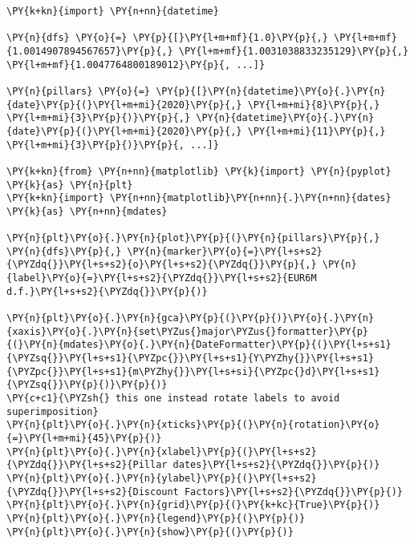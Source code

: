 \begin{Answer}
\begin{tcolorbox}[size=fbox, boxrule=1pt, colback=cellbackground, colframe=cellborder]
\begin{Verbatim}[commandchars=\\\{\}]
\PY{k+kn}{import} \PY{n+nn}{datetime}

\PY{n}{dfs} \PY{o}{=} \PY{p}{[}\PY{l+m+mf}{1.0}\PY{p}{,} \PY{l+m+mf}{1.0014907894567657}\PY{p}{,} \PY{l+m+mf}{1.0031038833235129}\PY{p}{,} \PY{l+m+mf}{1.0047764800189012}\PY{p}{, ...]}
       
\PY{n}{pillars} \PY{o}{=} \PY{p}{[}\PY{n}{datetime}\PY{o}{.}\PY{n}{date}\PY{p}{(}\PY{l+m+mi}{2020}\PY{p}{,} \PY{l+m+mi}{8}\PY{p}{,} \PY{l+m+mi}{3}\PY{p}{)}\PY{p}{,} \PY{n}{datetime}\PY{o}{.}\PY{n}{date}\PY{p}{(}\PY{l+m+mi}{2020}\PY{p}{,} \PY{l+m+mi}{11}\PY{p}{,} \PY{l+m+mi}{3}\PY{p}{)}\PY{p}{, ...]}

\PY{k+kn}{from} \PY{n+nn}{matplotlib} \PY{k}{import} \PY{n}{pyplot} \PY{k}{as} \PY{n}{plt}
\PY{k+kn}{import} \PY{n+nn}{matplotlib}\PY{n+nn}{.}\PY{n+nn}{dates} \PY{k}{as} \PY{n+nn}{mdates}

\PY{n}{plt}\PY{o}{.}\PY{n}{plot}\PY{p}{(}\PY{n}{pillars}\PY{p}{,} \PY{n}{dfs}\PY{p}{,} \PY{n}{marker}\PY{o}{=}\PY{l+s+s2}{\PYZdq{}}\PY{l+s+s2}{o}\PY{l+s+s2}{\PYZdq{}}\PY{p}{,} \PY{n}{label}\PY{o}{=}\PY{l+s+s2}{\PYZdq{}}\PY{l+s+s2}{EUR6M d.f.}\PY{l+s+s2}{\PYZdq{}}\PY{p}{)}

\PY{n}{plt}\PY{o}{.}\PY{n}{gca}\PY{p}{(}\PY{p}{)}\PY{o}{.}\PY{n}{xaxis}\PY{o}{.}\PY{n}{set\PYZus{}major\PYZus{}formatter}\PY{p}{(}\PY{n}{mdates}\PY{o}{.}\PY{n}{DateFormatter}\PY{p}{(}\PY{l+s+s1}{\PYZsq{}}\PY{l+s+s1}{\PYZpc{}}\PY{l+s+s1}{Y\PYZhy{}}\PY{l+s+s1}{\PYZpc{}}\PY{l+s+s1}{m\PYZhy{}}\PY{l+s+si}{\PYZpc{}d}\PY{l+s+s1}{\PYZsq{}}\PY{p}{)}\PY{p}{)}
\PY{c+c1}{\PYZsh{} this one instead rotate labels to avoid superimposition}
\PY{n}{plt}\PY{o}{.}\PY{n}{xticks}\PY{p}{(}\PY{n}{rotation}\PY{o}{=}\PY{l+m+mi}{45}\PY{p}{)}
\PY{n}{plt}\PY{o}{.}\PY{n}{xlabel}\PY{p}{(}\PY{l+s+s2}{\PYZdq{}}\PY{l+s+s2}{Pillar dates}\PY{l+s+s2}{\PYZdq{}}\PY{p}{)}
\PY{n}{plt}\PY{o}{.}\PY{n}{ylabel}\PY{p}{(}\PY{l+s+s2}{\PYZdq{}}\PY{l+s+s2}{Discount Factors}\PY{l+s+s2}{\PYZdq{}}\PY{p}{)}
\PY{n}{plt}\PY{o}{.}\PY{n}{grid}\PY{p}{(}\PY{k+kc}{True}\PY{p}{)}
\PY{n}{plt}\PY{o}{.}\PY{n}{legend}\PY{p}{(}\PY{p}{)}
\PY{n}{plt}\PY{o}{.}\PY{n}{show}\PY{p}{(}\PY{p}{)}
\end{Verbatim}
\end{tcolorbox}

\end{Answer}
